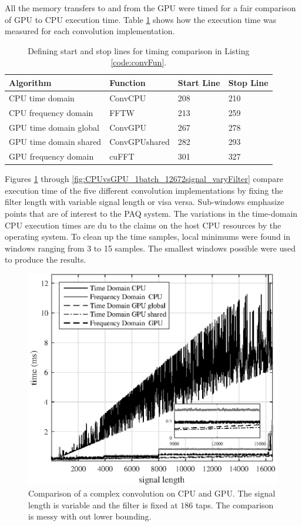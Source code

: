 All the memory transfers to and from the GPU were timed for a fair comparison of GPU to CPU execution time.
Table \ref{tab:CPUvsGPUtimingTable} shows how the execution time was measured for each convolution implementation.
\begin{table}
\caption{Defining start and stop lines for timing comparison in Listing \ref{code:convFun}.}
\begin{center}
\begin{tabular}{llll}
	\toprule
	Algorithm 				& Function		& Start Line	& Stop  Line		\\ \midrule
	CPU time domain 		& ConvCPU 		& 208			& 210 				\\
	CPU frequency domain 	& FFTW 			& 213			& 259 				\\
	GPU time domain global 	& ConvGPU 		& 267			& 278				\\
	GPU time domain shared 	& ConvGPUshared & 282			& 293				\\
	GPU frequency domain 	& cuFFT			& 301			& 327				\\ 
	\bottomrule
\end{tabular}
\end{center}
\label{tab:CPUvsGPUtimingTable}
\end{table}
Figures \ref{fig:CPUvsGPU_1batch_186taps_varySignal_noMin} through \ref{fig:CPUvsGPU_1batch_12672signal_varyFilter} compare execution time of the five different convolution implementations by fixing the filter length with variable signal length or visa versa.
Sub-windows emphasize points that are of interest to the PAQ system.
The variations in the time-domain CPU execution times are du to the claims on the host CPU resources by the operating system.
To clean up the time samples, local minimums were found in windows ranging from 3 to 15 samples.
The smallest windows possible were used to produce the results.
\begin{figure}
	\centering\includegraphics[width=5in]{figures/gpu_intro/CPUvsGPU_1batch_186taps_varySignal_noMin.eps}
	\caption{Comparison of a complex convolution on CPU and GPU. The signal length is variable and the filter is fixed at $186$ taps. The comparison is messy with out lower bounding.}
	\label{fig:CPUvsGPU_1batch_186taps_varySignal_noMin}
\end{figure}
